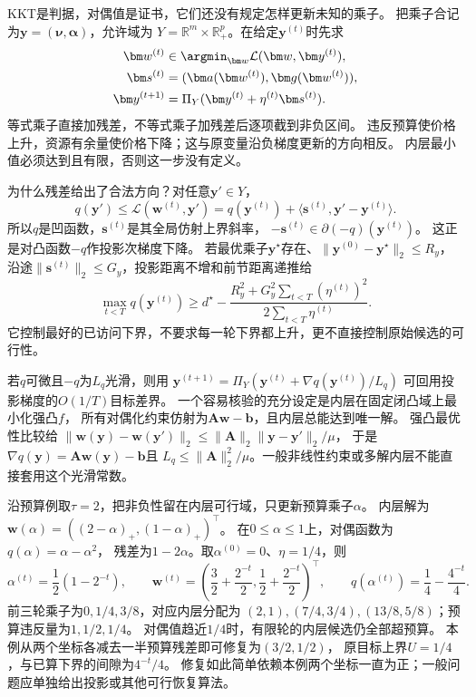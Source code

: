 KKT是判据，对偶值是证书，它们还没有规定怎样更新未知的乘子。
把乘子合记为$\bm y=(\bm\nu,\bm\alpha)$，允许域为
$Y=\mathbb R^m\times\mathbb R_+^p$。在给定$\bm y^{(t)}$时先求
\[
 \begin{aligned}
 \bm w^{(t)}&\in\argmin_{\bm w}\mathcal L(\bm w,\bm y^{(t)}),\\
 \bm s^{(t)}&=(\bm a(\bm w^{(t)}),\bm g(\bm w^{(t)})),\\
 \bm y^{(t+1)}&=\Pi_Y(\bm y^{(t)}+\eta^{(t)}\bm s^{(t)}).
 \end{aligned}
\]
等式乘子直接加残差，不等式乘子加残差后逐项截到非负区间。
违反预算使价格上升，资源有余量使价格下降；这与原变量沿负梯度更新的方向相反。
内层最小值必须达到且有限，否则这一步没有定义。

为什么残差给出了合法方向？对任意$\bm y'\in Y$，
\[
 q(\bm y')\leq\mathcal L(\bm w^{(t)},\bm y')
 =q(\bm y^{(t)})+\langle\bm s^{(t)},\bm y'-\bm y^{(t)}\rangle.
\]
所以$q$是凹函数，$\bm s^{(t)}$是其全局仿射上界斜率，
$-\bm s^{(t)}\in\partial(-q)(\bm y^{(t)})$。
这正是对凸函数$-q$作投影次梯度下降。
若最优乘子$\bm y^\star$存在、$\|\bm y^{(0)}-\bm y^\star\|_2\leq R_y$，
沿途$\|\bm s^{(t)}\|_2\leq G_y$，投影距离不增和前节距离递推给
\[
 \max_{t<T}q(\bm y^{(t)})\geq
 d^\star-\frac{R_y^2+G_y^2\sum_{t<T}(\eta^{(t)})^2}{2\sum_{t<T}\eta^{(t)}}.
\]
它控制最好的已访问下界，不要求每一轮下界都上升，更不直接控制原始候选的可行性。

若$q$可微且$-q$为$L_q$光滑，则用
$\bm y^{(t+1)}=\Pi_Y(\bm y^{(t)}+\nabla q(\bm y^{(t)})/L_q)$
可回用投影梯度的$O(1/T)$目标差界。
一个容易核验的充分设定是内层在固定闭凸域上最小化强凸$f$，
所有对偶化约束仿射为$\bm A\bm w-\bm b$，且内层总能达到唯一解。
强凸最优性比较给
$\|\bm w(\bm y)-\bm w(\bm y')\|_2
\leq\|\bm A\|_2\|\bm y-\bm y'\|_2/\mu$，
于是$\nabla q(\bm y)=\bm A\bm w(\bm y)-\bm b$且
$L_q\leq\|\bm A\|_2^2/\mu$。一般非线性约束或多解内层不能直接套用这个光滑常数。

沿预算例取$\tau=2$，把非负性留在内层可行域，只更新预算乘子$\alpha$。
内层解为
$\bm w(\alpha)=((2-\alpha)_+,(1-\alpha)_+)^\top$。
在$0\leq\alpha\leq1$上，对偶函数为$q(\alpha)=\alpha-\alpha^2$，
残差为$1-2\alpha$。取$\alpha^{(0)}=0$、$\eta=1/4$，则
\[
 \alpha^{(t)}=\frac12(1-2^{-t}),\qquad
 \bm w^{(t)}=\left(\frac32+\frac{2^{-t}}2,\frac12+\frac{2^{-t}}2\right)^\top,
 \qquad q(\alpha^{(t)})=\frac14-\frac{4^{-t}}4.
\]
前三轮乘子为$0,1/4,3/8$，对应内层分配为
$(2,1),(7/4,3/4),(13/8,5/8)$；预算违反量为$1,1/2,1/4$。
对偶值趋近$1/4$时，有限轮的内层候选仍全部超预算。
本例从两个坐标各减去一半预算残差即可修复为$(3/2,1/2)$，
原目标上界$U=1/4$，与已算下界的间隙为$4^{-t}/4$。
修复如此简单依赖本例两个坐标一直为正；一般问题应单独给出投影或其他可行恢复算法。

